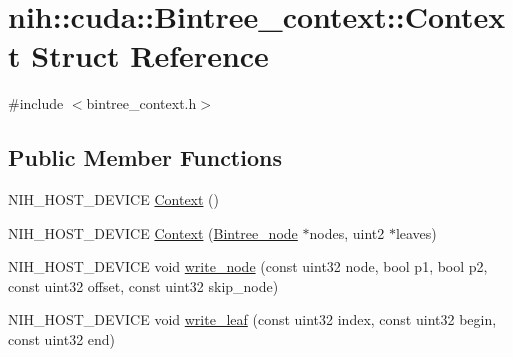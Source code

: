 \hypertarget{structnih_1_1cuda_1_1_bintree__context_1_1_context}{
\section{nih\-:\-:cuda\-:\-:\-Bintree\-\_\-context\-:\-:\-Context \-Struct \-Reference}
\label{structnih_1_1cuda_1_1_bintree__context_1_1_context}
}


{\ttfamily \#include $<$bintree\-\_\-context.\-h$>$}

\subsection*{\-Public \-Member \-Functions}
\begin{DoxyCompactItemize}
\item 
\-N\-I\-H\-\_\-\-H\-O\-S\-T\-\_\-\-D\-E\-V\-I\-C\-E \hyperlink{structnih_1_1cuda_1_1_bintree__context_1_1_context_a38ac72182031ce53aebdd6448969f667}{\-Context} ()
\item 
\-N\-I\-H\-\_\-\-H\-O\-S\-T\-\_\-\-D\-E\-V\-I\-C\-E \hyperlink{structnih_1_1cuda_1_1_bintree__context_1_1_context_a5abd5cad3dee1ff0c9baa4b3f4226d89}{\-Context} (\hyperlink{structnih_1_1_bintree__node}{\-Bintree\-\_\-node} $\ast$nodes, uint2 $\ast$leaves)
\item 
\-N\-I\-H\-\_\-\-H\-O\-S\-T\-\_\-\-D\-E\-V\-I\-C\-E void \hyperlink{structnih_1_1cuda_1_1_bintree__context_1_1_context_a3a92c5a938bca333b9277692ed381727}{write\-\_\-node} (const uint32 node, bool p1, bool p2, const uint32 offset, const uint32 skip\-\_\-node)
\item 
\-N\-I\-H\-\_\-\-H\-O\-S\-T\-\_\-\-D\-E\-V\-I\-C\-E void \hyperlink{structnih_1_1cuda_1_1_bintree__context_1_1_context_aa262fa95c49e0375e580f2344ce3bc83}{write\-\_\-leaf} (const uint32 index, const uint32 begin, const uint32 end)
\end{DoxyCompactItemize}
